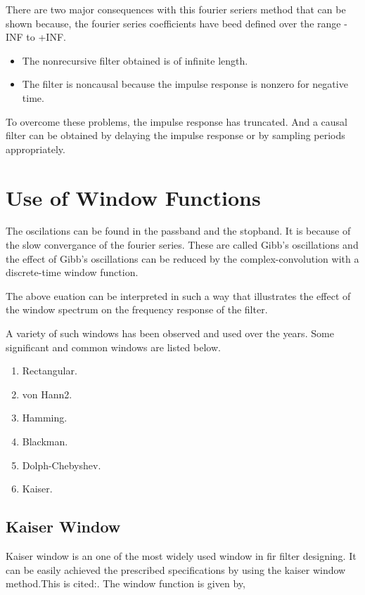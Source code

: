 \documentclass[twoside,12pt,times,onecolumn,a4paper]{report}
\begin{document}

There are two major consequences with this fourier seriers method that can be shown because, the fourier series coefficients have beed defined over the range -INF to +INF.
\begin{itemize}
  \item The nonrecursive filter obtained is of infinite length.
  \item The filter is noncausal because the impulse response is nonzero for negative time.
\end{itemize}

To overcome these problems, the impulse response has truncated. And a causal filter can be obtained by delaying the impulse response or by sampling periods appropriately.



\section{Use of Window Functions}
\hspace{4em}The oscilations can be found in the passband and the stopband. It is because of the slow convergance of the fourier series. These are called Gibb's oscillations and the effect of Gibb's oscillations\cite{dspdeer} can be reduced by the complex-convolution with a discrete-time window function. 



The above euation can be interpreted in such a way that illustrates the effect of the window spectrum on the frequency response of the filter.


A variety of such windows has been observed and used over the years. Some significant and common windows are listed below.

\begin{enumerate}
  \item Rectangular.
  \item von Hann2.
  \item Hamming.
  \item Blackman.
  \item Dolph-Chebyshev.
  \item Kaiser.
\end{enumerate}

\subsection{Kaiser Window}
\hspace{4em}Kaiser window is an one of the most widely used window in fir filter designing. It can be easily achieved the prescribed specifications by using the kaiser window method.This is cited:\cite{ukessay}. The window function is given by,
\end{document}
